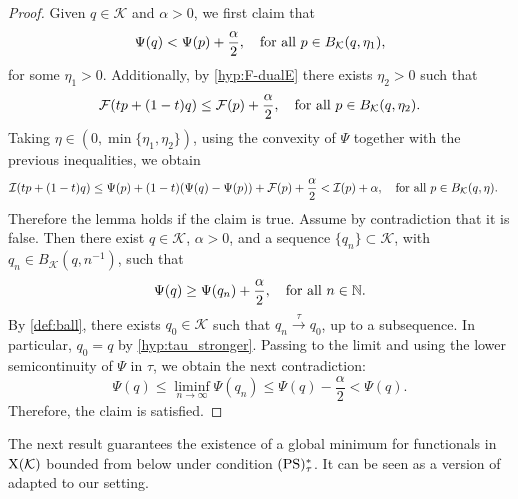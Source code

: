 \documentclass{article}
\newcommand{\boK}{\mathcal{K}}
\newcommand{\boI}{\mathcal{I}}
\newcommand{\boF}{\mathcal{F}}
\newcommand{\ball}{B_\boK}
\newcommand{\X}{{\textnormal X}}
\newcommand{\PS}{(\textnormal{PS})^{*}_\tau}
\theoremstyle{definition}
\begin{document}
\begin{proof}
Given $q\in \boK$ and $\alpha>0$, we first claim that
\begin{equation}\label{Claim-proof}
		\Psi(q)<\Psi(p)+\dfrac{\alpha}{2},\quad\hbox{for all }p\in\ball(q,\eta_1),
	\end{equation}
for some $\eta_1>0$. Additionally, by \eqref{hyp:F-dualE} there exists $\eta_2>0$ such that
\begin{equation}\label{ineq:Fmin}
		\boF(tp+(1-t)q)\leq \boF(p)+\frac{\alpha}{2}, \quad\hbox{for all }p\in\ball(q,\eta_2).
	\end{equation}
Taking $\eta\in (0,\min\{\eta_1,\eta_2\})$, using the convexity of $\Psi$ together with the previous inequalities, we obtain
	\begin{align}
		\boI(tp+(1-t)q)&\leq \Psi(p)+(1-t)(\Psi(q)-\Psi(p)) + \boF(p)+\frac{\alpha}{2}<\boI(p)+\alpha,\quad\hbox{for all }p\in\ball(q,\eta).
	\end{align}
Therefore the lemma holds if the claim is true. Assume by contradiction that it is false. Then there exist $q\in\boK$, $\alpha>0$, and a sequence $\{q_n\}\subset\boK$, with $ q_n\in B_\boK(q,n^{-1})$, such that
\begin{equation}
    \Psi(q)\geq\Psi(q_n)+\dfrac{\alpha}{2},\quad\hbox{for all }n\in\mathbb{N}.
\end{equation}
By \eqref{def:ball}, there exists $q_0\in\boK$ such that $q_n\xrightarrow{\tau} q_0$, up to a subsequence. In particular, $q_0=q$ by \eqref{hyp:tau_stronger}. Passing to the limit and using the lower semicontinuity of $\Psi$ in $\tau$, we obtain the next contradiction:
\begin{equation}
    \Psi(q)\leq\liminf_{n\to\infty} \Psi(q_n)\leq\Psi(q)-\dfrac{\alpha}{2}<\Psi(q).
\end{equation}
Therefore, the claim is satisfied.
\end{proof}
The next result guarantees the existence of a global minimum for functionals in $\X(\boK)$ bounded from below under condition $\PS$. It can be seen as a version of \cite[Proposition 2]{Bre-Nir} adapted to our setting.
\end{document}
